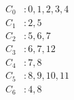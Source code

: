 \begin{align*}
	C_{0} &: 0, 1, 2, 3, 4\\
	C_{1} &: 2, 5\\
	C_{2} &: 5, 6, 7\\
	C_{3} &: 6, 7, 12\\
	C_{4} &: 7, 8\\
	C_{5} &: 8, 9, 10, 11\\
	C_{6} &: 4, 8\\
\end{align*}